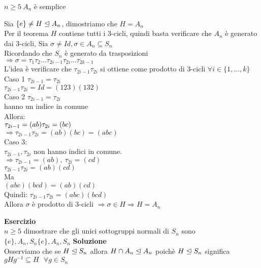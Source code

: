 \documentclass[12px]{article}
\begin{document}
{\begin{dimo}
	\end{dimo}
	\begin{coro}
		$n\geq 5 \ A_n$ è semplice
	\end{coro}
	\begin{dimo}
		Sia $\{e\}\neq H\trianglelefteq A_n$, dimostriamo che $H=A_n$\\
		Per il teorema  $H$ contiene tutti i $3$-cicli, quindi basta verificare che $A_n$ è generato dai  $3$-cicli, Sia $\sigma\neq Id, \sigma\in A_n\subseteq S_n$\\
Ricordando che  $S_n$ è generato da trasposizioni\\
$ \Rightarrow \sigma = \tau_1\tau_2\ldots\tau_{2i-1}\tau_{2i}\ldots\tau_{2k-1}$ \\
L'idea è verificare che $\tau_{2i-1}\tau_{2i}$ si ottiene come prodotto di  $3$-cicli $\forall i\in \{1,\ldots,k\}$\\
Caso 1  $\tau_{2i-1} = \tau_{2i}$\\
$\tau_{2i-1}\tau_{2i} = Id = (123)(132)$\\
Caso 2  $\tau_{2i-1}=\tau_{2i}$\\
hanno un indice in comune\\
Allora:\\
$\tau_{2i-1} = (ab)\\
\tau_{2i} = (bc)$\\
$ \Rightarrow \tau_{2i-1}\tau_{2i} = (ab)(bc) = (abc)$ \\
Caso 3:\\ $\tau_{2i-1},\tau_{2i}$ non hanno indici in comune.\\
$ \Rightarrow \tau_{2i-1} = (ab), \ \tau_{2i} = (cd)$ \\
$\tau_{2i-1}\tau_{2i} = (ab)(cd)$\\
Ma \\
$(abc)(bcd) = (ab)(cd)$\\
Quindi:
$\tau_{2i-1}\tau_{2i} = (abc)(bcd)$\\
Allora  $\sigma$ è prodotto di $3$-cicli $ \Rightarrow \sigma \in H \Rightarrow H = A_n$
	\end{dimo}
	\textbf{Esercizio}\\
	$n\geq 5$ dimostrare che gli unici sottogruppi normali di $S_n$ sono $\{e\}, A_n, S_n\{e\}, A_n, S_n$
	\textbf{Soluzione}\\
	Osserviamo che se $ H\trianglelefteq S_n$ allora  $H\cap A_n\trianglelefteq A_n$ poichè  $H\trianglelefteq S_n$ significa \\
	$gHg^{-1}\subseteq H \ \ \ \forall g\in S_n$\\
}
\end{document}
